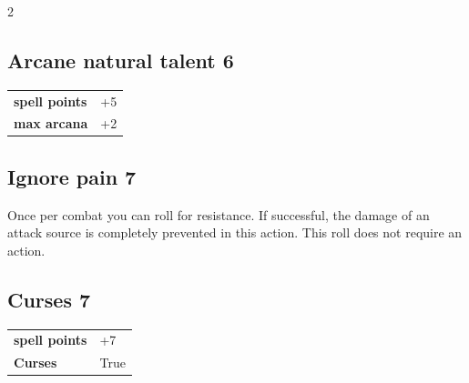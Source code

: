 \begin{multicols}{2}
\begin{tcolorbox}
\end{tcolorbox}

\begin{tcolorbox}
    \subsection*{Arcane natural talent \hfill \small{6 }}
    \tcblower




\begin{tabular}{@{}ll@{}}
    \textbf{spell points} & +5\\
    \textbf{max arcana} & +2\\
\end{tabular}


\end{tcolorbox}

\begin{tcolorbox}
    \subsection*{Ignore pain \hfill \small{7 }}
    \tcblower
Once per combat you can roll for resistance. If successful, the damage of an attack source is completely prevented in this action. This roll does not require an action.


\vspace{3mm}



\end{tcolorbox}

\begin{tcolorbox}
    \subsection*{Curses \hfill \small{7 }}
    \tcblower




\begin{tabular}{@{}ll@{}}
    \textbf{spell points} & +7\\
    \textbf{Curses} & True\\
\end{tabular}


\end{tcolorbox}
\end{multicols}
